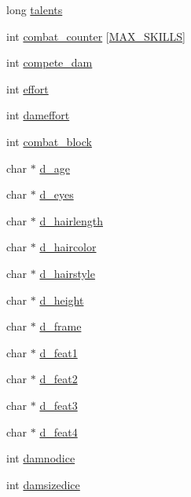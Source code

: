 \begin{DoxyCompactItemize}
long \hyperlink{structchar__data_a7b40267243e864898ae2efc441491c53}{talents}
\item 
int \hyperlink{structchar__data_a55974ffbe7497a20a925af20f32c963e}{combat\-\_\-counter} \mbox{[}\hyperlink{structs_8h_a4e56530a094cfb02145de1378db9cd6d}{M\-A\-X\-\_\-\-S\-K\-I\-L\-L\-S}\mbox{]}
\item 
int \hyperlink{structchar__data_a000b4b9bc4f3707e65cd1881afae5b22}{compete\-\_\-dam}
\item 
int \hyperlink{structchar__data_a18becfa8b0136451c576a20f7686005d}{effort}
\item 
int \hyperlink{structchar__data_adc5db19f43a2f237f874d941cb26a3d4}{dameffort}
\item 
int \hyperlink{structchar__data_ac976542e022840cef9043bb0ca50b5e9}{combat\-\_\-block}
\item 
char $\ast$ \hyperlink{structchar__data_aaf333ecb926cf29cfca5f911bb3ff989}{d\-\_\-age}
\item 
char $\ast$ \hyperlink{structchar__data_ac3f9dc5a806aaf75c57e44d5e8a0e774}{d\-\_\-eyes}
\item 
char $\ast$ \hyperlink{structchar__data_adfba6cd00766ec12d5103f960ee1e7f1}{d\-\_\-hairlength}
\item 
char $\ast$ \hyperlink{structchar__data_a59a3f47bd5e0c39e4c55d57d04d13ce0}{d\-\_\-haircolor}
\item 
char $\ast$ \hyperlink{structchar__data_a728a6ae6c3c9fec6a3a0aa32b22aaa7a}{d\-\_\-hairstyle}
\item 
char $\ast$ \hyperlink{structchar__data_aabe50434d10df6a23dc1e16279db07eb}{d\-\_\-height}
\item 
char $\ast$ \hyperlink{structchar__data_a32623cddd3e9db3e1d3f746e23a3938b}{d\-\_\-frame}
\item 
char $\ast$ \hyperlink{structchar__data_ab0610dbb0fa4d2024cf17a878c7a18be}{d\-\_\-feat1}
\item 
char $\ast$ \hyperlink{structchar__data_a3f48105ee4ea08e6350b2e2c147a1046}{d\-\_\-feat2}
\item 
char $\ast$ \hyperlink{structchar__data_ae6f9d0dc7cb1bf42715d924d7e8cc5af}{d\-\_\-feat3}
\item 
char $\ast$ \hyperlink{structchar__data_ad869ef1f349674715565c87d1ced1a1e}{d\-\_\-feat4}
\item 
int \hyperlink{structchar__data_a4fb27c73c0ffe0021a796588556a03f1}{damnodice}
\item 
int \hyperlink{structchar__data_a096418fbd272590399075ab649a8082e}{damsizedice}
\item 

\end{DoxyCompactItemize}
